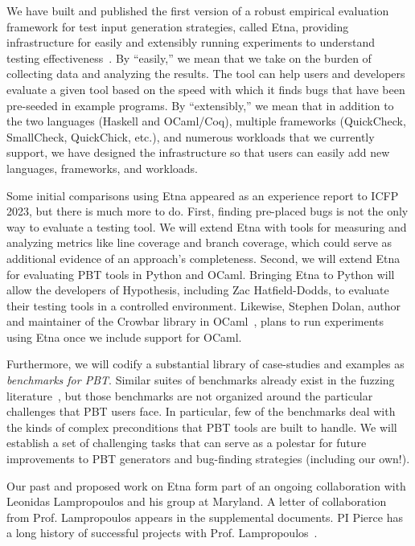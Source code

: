 We have built and published the first version of a robust empirical evaluation
framework for
test input generation strategies, called Etna, providing infrastructure
for easily and extensibly running experiments to understand testing
effectiveness~\cite{shi2023etna}.  By ``easily,'' we mean that we take on the burden of
collecting data and analyzing the results.  The tool
can help users and developers evaluate a given tool based on
the
speed with which it finds bugs that have been pre-seeded in example programs. By
``extensibly,'' we mean that in addition to the two languages (Haskell and
OCaml/Coq), multiple frameworks (QuickCheck, SmallCheck, QuickChick, etc.), and
numerous workloads that we currently support, we have designed the
infrastructure so that users can easily add new
languages, frameworks, and workloads.

Some initial comparisons using Etna appeared as an experience report to ICFP
2023, but there is much more to do. First, finding pre-placed bugs is not the
only way to evaluate a testing tool. We will extend Etna with
tools for measuring and analyzing metrics like line coverage and branch
coverage, which could serve as additional evidence of an approach's
completeness. Second, we will extend Etna for evaluating PBT
tools in Python and OCaml. Bringing Etna to Python will
allow the developers of Hypothesis, including Zac Hatfield-Dodds,\iflater{}\fi{} to evaluate their testing tools in a controlled
environment. Likewise, Stephen Dolan, author and maintainer of
the Crowbar library in OCaml~\cn, plans to run experiments using Etna once
we include support for OCaml.

Furthermore, we will codify a substantial library of case-studies and examples as
{\em benchmarks for PBT}. Similar suites of benchmarks already exist in the
fuzzing literature~\cite{hazimeh_magma_2021}, but those benchmarks are not
organized around the particular challenges that PBT users face. In particular,
few of the benchmarks deal with the kinds of complex preconditions that PBT
tools are built to handle. We will establish a set of challenging tasks that
can serve as a polestar for future improvements to PBT generators and
bug-finding strategies (including our own!).

Our past and proposed work on Etna form part of an ongoing
collaboration with Leonidas Lampropoulos and his group at Maryland.
A letter of collaboration
from Prof.{} Lampropoulos appears in the supplemental documents.
PI Pierce has a long history
of successful projects with Prof.
Lampropoulos~\cite[etc.]{beginners-luck,DBLP:conf/esop/GoldsteinHLP21,lampropoulos_coverage_2019,Lampropoulos&18,OLDlampropoulos19fuzzchick}.

